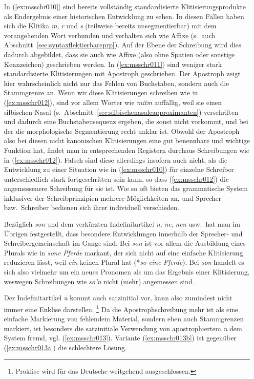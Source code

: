 In (\ref{ex:msschr010}) sind bereits vollständig standardisierte Klitisierungsprodukte als Endergebnis einer historischen Entwicklung zu sehen.
In diesen Fällen haben sich die Klitika \textit{m}, \textit{r} und \textit{s} (teilweise bereits unsegmentierbar) mit dem vorangehenden Wort verbunden und verhalten sich wie Affixe (s.\ auch Abschnitt~\ref{sec:syntaxflektierbareprp}).
Auf der Ebene der Schreibung wird dies dadurch abgebildet, dass sie auch wie Affixe (also ohne Spatien oder sonstige Kennzeichen) geschrieben werden.
In (\ref{ex:msschr011}) sind weniger stark standardisierte Klitisierungen mit Apostroph geschrieben.
Der Apostroph zeigt hier wahrscheinlich nicht nur das Fehlen von Buchstaben, sondern auch die Stammgrenze an.
Wenn wir diese Klitisierungen schreiben wie in (\ref{ex:msschr012}), sind vor allem Wörter wie \textit{mitm} auffällig, weil sie einen silbischen Nasal (s.\ Abschnitt~\ref{sec:silbischenasaleapproximanten}) verschriften und dadurch eine Buchstabensequenz ergeben, die sonst nicht vorkommt, und bei der die morphologische Segmentierung recht unklar ist.
Obwohl der Apostroph also bei diesen nicht kanonischen Klitisierungen eine gut benennbare und wichtige Funktion hat, findet man in entsprechenden Registern durchaus Schreibungen wie in (\ref{ex:msschr012}).
Falsch sind diese allerdings insofern auch nicht, als die Entwicklung zu einer Situation wie in (\ref{ex:msschr010}) für einzelne Schreiber unterschiedlich stark fortgeschritten sein kann, so dass (\ref{ex:msschr012}) die angemessenere Schreibung für sie ist.
Wie so oft bieten das grammatische System inklusiver der Schreibprinzipien mehrere Möglichkeiten an, und Sprecher bzw.\ Schreiber bedienen sich ihrer individuell verschieden.

Bezüglich \textit{son} und dem verkürzten Indefinitartikel \textit{n}, \textit{ne}, \textit{nen} usw.\ hat man im Übrigen festgestellt, dass besondere Entwicklungen innerhalb der Sprecher- und Schreibergemeinschaft im Gange sind.
Bei \textit{son} ist vor allem die Ausbildung eines Plurals wie in \textit{sone Pferde} markant, der sich nicht auf eine einfache Klitisierung reduzieren lässt, weil \textit{ein} keinen Plural hat (*\textit{so eine Pferde}).
Bei \textit{son} handelt es sich also vielmehr um ein neues Pronomen als um das Ergebnis einer Klitisierung, weswegen Schreibungen wie \textit{so'n} nicht (mehr) angemessen sind.

Der Indefinitartikel \textit{n} kommt \zB auch satzinitial vor, kann also zumindest nicht immer eine Enklise darstellen.\label{abs:nen}%
\footnote{Proklise wird für das Deutsche weitgehend ausgeschlossen.}
Da die Apo\-stroph\-schrei\-bung mehr ist als eine einfache Markierung von fehlendem Material, sondern eben auch Stammgrenzen markiert, ist besonders die satzinitiale Verwendung von apostrophiertem \textit{n} dem System fremd, vgl. (\ref{ex:msschr013}).
Variante (\ref{ex:msschr013b}) ist gegenüber (\ref{ex:msschr013a}) die schlechtere Lösung.


